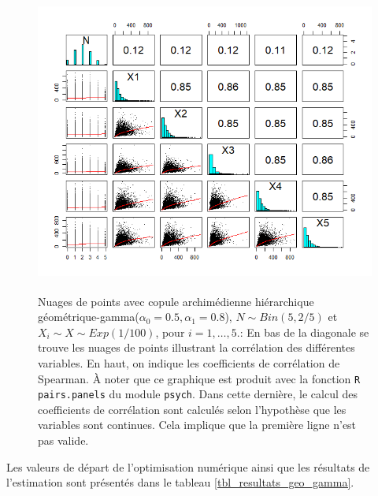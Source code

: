 \documentclass{article}
\begin{document}
	\begin{figure}[H]
		\centering
		\includegraphics[height=10cm]{Graph/scatterplot_geo_gamma.png}
		\caption[Nuages de points du scénario \ref{scenario_geo_gamma}]
		{Nuages de points avec copule archimédienne hiérarchique géométrique-gamma($\alpha_0=0.5, \alpha_1 = 0.8$), $N \sim Bin(5, 2/5)$ et $X_i \sim X \sim Exp(1/100)$, pour $i=1,\dots, 5$.:
			En bas de la diagonale se trouve les nuages de points illustrant la corrélation des différentes variables. En haut, on indique les coefficients de corrélation de Spearman. À noter que ce graphique est produit avec la fonction \texttt{R} \texttt{pairs.panels} du module \texttt{psych}. Dans cette dernière, le calcul des coefficients de corrélation sont calculés selon l'hypothèse que les variables sont continues. Cela implique que la première ligne n'est pas valide.}
		\label{graph_scatterplot_geo_gamma}
	\end{figure}

	Les valeurs de départ de l'optimisation numérique ainsi que les résultats de l'estimation sont présentés dans le tableau \ref{tbl_resultats_geo_gamma}.
	
\end{document}
